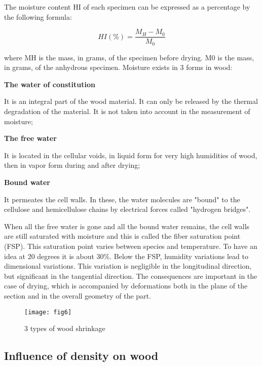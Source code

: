 The moisture content HI of each specimen can be expressed as a percentage by the following formula:

\begin{equation}
	HI(\%) = \frac{M_{H}-M_{0}}{M_{0}}
\end{equation}

where MH is the mass, in grams, of the specimen before drying. M0 is the mass, in grams, of the anhydrous specimen. Moisture exists in 3 forms in wood:

\smallskip

\textbf{The water of constitution}

It is an integral part of the wood material. It can only be released by the thermal degradation of the material. It is not taken into account in the measurement of moisture;

\smallskip

\textbf{The free water}

It is located in the cellular voids, in liquid form for very high humidities of wood, then in vapor form during and after drying;

\smallskip

\textbf{Bound water}

It permeates the cell walls. In these, the water molecules are "bound" to the cellulose and hemicellulose chains by electrical forces called "hydrogen bridges".

\smallskip

When all the free water is gone and all the bound water remains, the cell walls are still saturated with moisture and this is called the fiber saturation point (FSP). This saturation point varies between species and temperature. To have an idea at 20 degrees it is about 30\%. Below the FSP, humidity variations lead to dimensional variations. This variation is negligible in the longitudinal direction, but significant in the tangential direction. The consequences are important in the case of drying, which is accompanied by deformations both in the plane of the section and in the overall geometry of the part.

\graphicspath{{Images/}}
\begin{figure}[htp]
	\centering
	\texttt{[image: fig6]}
	\caption{3 types of wood shrinkage}
	\label{fig:galaxy}
\end{figure}

\subsection{Influence of density on wood}

